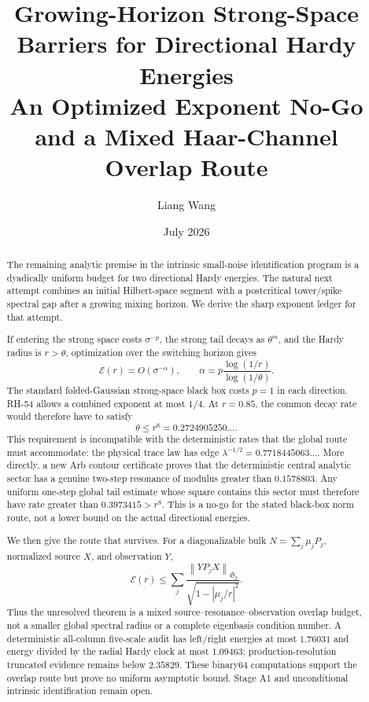 \documentclass[11pt]{article}
\title{Growing-Horizon Strong-Space Barriers for Directional Hardy Energies\\
\large An Optimized Exponent No-Go and a Mixed Haar-Channel Overlap Route}
\author{Liang Wang}
\date{July 2026}
\theoremstyle{remark}
\newcommand{\norm}[1]{\left\lVert#1\right\rVert}
\newcommand{\HS}{\mathfrak S_2}
\newcommand{\cE}{\mathcal E}
\begin{document}
\maketitle

\begin{abstract}
The remaining analytic premise in the intrinsic small-noise identification
program is a dyadically uniform budget for two directional Hardy energies.
The natural next attempt combines an initial Hilbert-space segment with a
postcritical tower/spike spectral gap after a growing mixing horizon.  We
derive the sharp exponent ledger for that attempt.

If entering the strong space costs $\sigma^{-p}$, the strong tail decays as
$\theta^m$, and the Hardy radius is $r>\theta$, optimization over the
switching horizon gives
\[
 \cE(r)=O(\sigma^{-\alpha}),
 \qquad
 \alpha=p\frac{\log(1/r)}{\log(1/\theta)}.
\]
The standard folded-Gaussian strong-space black box costs $p=1$ in each
direction.  RH-54 allows a combined exponent at most $1/4$.  At $r=0.85$,
the common decay rate would therefore have to satisfy
\[
 \theta\le r^8=0.2724905250\ldots.
\]
This requirement is incompatible with the deterministic rates that the
global route must accommodate: the physical trace law has edge
$\lambda^{-1/2}=0.7718445063\ldots$.  More directly, a new Arb contour
certificate proves that the deterministic central analytic sector has a
genuine two-step resonance of modulus greater than $0.1578803$.  Any
uniform one-step global tail estimate whose square contains this sector must
therefore have rate greater than $0.3973415>r^8$.  This is a no-go for the
stated black-box norm route, not a lower bound on the actual directional
energies.

We then give the route that survives.  For a diagonalizable bulk
$N=\sum_j\mu_jP_j$, normalized source $X$, and observation $Y$,
\[
 \cE(r)
 \le
 \sum_j\frac{\norm{YP_jX}_{\HS}}
 {\sqrt{1-|\mu_j/r|^2}}.
\]
Thus the unresolved theorem is a mixed source--resonance--observation
overlap budget, not a smaller global spectral radius or a complete
eigenbasis condition number.  A deterministic all-column five-scale audit
has left/right energies at most $1.76031$ and energy divided by the radial
Hardy clock at most $1.09463$; production-resolution truncated evidence
remains below $2.35829$.  These binary64 computations support the overlap
route but prove no uniform asymptotic bound.  Stage A1 and unconditional
intrinsic identification remain open.
\end{abstract}
\end{document}
